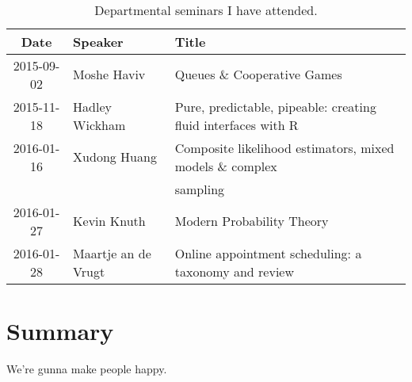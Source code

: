 \documentclass[12pt,a4paper]{article}
\begin{document}
\begin{table}[hh]
\caption{
Departmental seminars I have attended.%
}
\centering
\ ~~~~ \\
\label{tab:seminars}
\begin{tabular}{cll}
\toprule
Date & Speaker & Title \\
\midrule
2015-09-02 & Moshe Haviv &
Queues \& Cooperative Games \\
%
2015-11-18 & Hadley Wickham &
Pure, predictable, pipeable: creating fluid interfaces with R \\
%
2016-01-16 & Xudong Huang &
Composite likelihood estimators, mixed models \& complex \\
&&sampling \\
%
2016-01-27 & Kevin Knuth &
Modern Probability Theory \\
%
2016-01-28 & Maartje an de Vrugt &
Online appointment scheduling: a taxonomy and review \\
%
%
\bottomrule
\end{tabular}
\end{table}




\section{Summary}






We're gunna make people happy.
\end{document}
